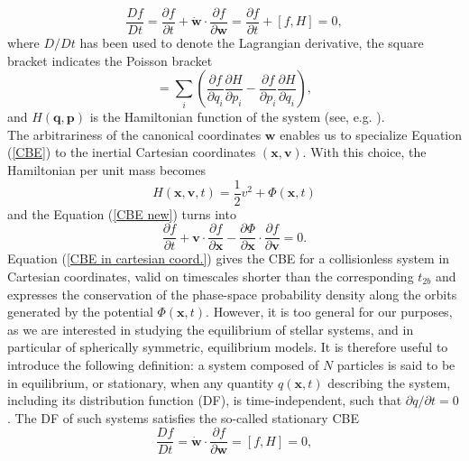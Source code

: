 \documentclass[12pt,twoside,openany]{book}
\begin{document}
\begin{equation}\label{CBE new}
    \frac{Df}{Dt}=\frac{\partial f}{\partial t}+
    \mathbf{\dot{w}}\cdot \frac{\partial f}{\partial \mathbf{w}}=
    \frac{\partial f}{\partial t}+[f,H]=0,
\end{equation}
where $D/Dt$ has been used to denote the Lagrangian derivative,
the square bracket indicates the Poisson bracket
\begin{equation}
[f,H]
=
\sum_i
\left(
\frac{\partial f}{\partial q_i}
\frac{\partial H}{\partial p_i}
-
\frac{\partial f}{\partial p_i}
\frac{\partial H}{\partial q_i}
\right),
\label{Poisson bracket}
\end{equation}
and $H(\mathbf{q},\mathbf{p})$ is the Hamiltonian function of the system (see, e.g. \citealt{Binney_book}).\\The arbitrariness of the canonical coordinates $\mathbf{w}$ enables us to specialize Equation (\ref{CBE}) to the inertial Cartesian coordinates $(\mathbf{x},\mathbf{v})$. With this choice, the Hamiltonian per unit mass becomes
\begin{equation}\label{Hamiltonian in cartesian coord.}
    H(\mathbf{x},\mathbf{v},t)=\frac{1}{2}v^2+\Phi(\mathbf{x},t)
\end{equation}
and the Equation (\ref{CBE new}) turns into
\begin{equation}\label{CBE in cartesian coord.}
    \frac{\partial f}{\partial t}+\mathbf{v}\cdot
    \frac{\partial f}{\partial \mathbf{x}}-
    \frac{\partial \Phi}{\partial \mathbf{x}}
    \cdot \frac{\partial f}{\partial \mathbf{v}}=0.
\end{equation}
Equation (\ref{CBE in cartesian coord.}) gives the CBE for a collisionless system in Cartesian coordinates, valid on timescales shorter than the corresponding $t_{2b}$ and expresses the conservation of the phase-space probability density along the orbits generated by the potential $\Phi(\mathbf{x},t)$. However, it is too general for our purposes, as we are interested in studying the equilibrium of stellar systems, and in particular of spherically symmetric, equilibrium models. It is therefore useful to introduce the following definition: a system composed of $N$ particles is said to be in equilibrium, or stationary, when any quantity $q(\mathbf{x},t)$ describing the system, including its distribution function (DF), is time-independent, such that $\partial q/\partial t=0$. The DF of such systems satisfies the so-called stationary CBE
\begin{equation}\label{Stationary CBE}
    \frac{Df}{Dt}=
    \mathbf{\dot{w}}\cdot \frac{\partial f}{\partial \mathbf{w}}=
    [f,H]=0,
\end{equation}
\end{document}
